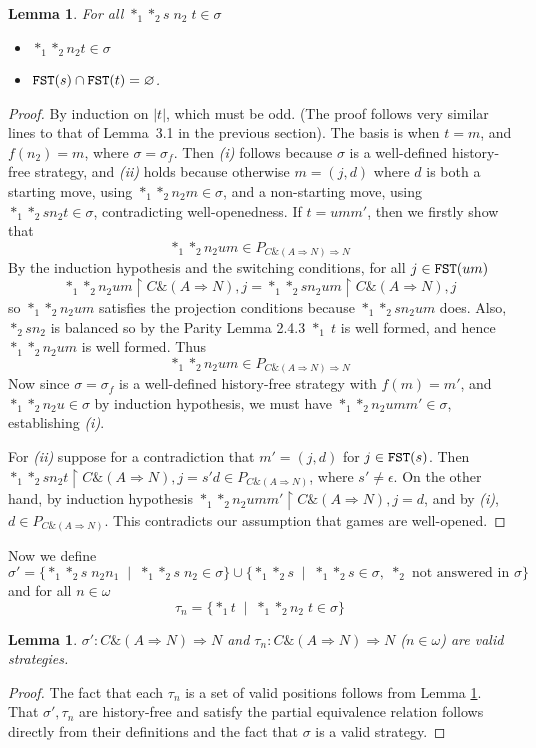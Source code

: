 \documentclass[11pt]{article}
\newtheorem{lemma}[theorem]{Lemma}
\newcommand{\Rest}{{\upharpoonright}}
\newcommand{\with}{\mbox{$\&$}}
\newcommand{\varempty}{\varnothing}
\begin{document}
\begin{lemma}\label{lem1}
For all $ *_1 *_2 s \;n_2 \; t\in\sigma$
\begin{itemize}
\item[(i)] $*_1 *_2 n_2 t\in\sigma$
\item[(ii)] ${\tt FST}(s)\cap {\tt FST}(t)=\varempty$.
\end{itemize}
\end{lemma}
\begin{proof} By induction on $|t|$, which must be odd. (The proof follows very similar
lines to that of Lemma~3.1 in the previous section). The basis is
when $t = m$, and $f(n_2 ) = m$, where $\sigma = \sigma_f$. Then
\textit{(i)} follows because $\sigma$ is a well-defined history-free
strategy,
and \textit{(ii)} holds because otherwise $m = (j, d)$ where $d$ is
both
a starting move, using $*_1 *_2 n_2 m \in \sigma$, and a non-starting
move, using $*_1 *_2 s n_2  t\in\sigma$, contradicting
well-openedness.
If $t=umm'$, then we firstly show that $$*_1 *_2  n_2 um
\in P_{C\with (A\Rightarrow N)\Rightarrow N}$$ By the induction
hypothesis and the switching conditions, for all $j\in {\tt
FST}(um)$ $$ *_1 *_2 n_2 um\Rest {C\with(A\Rightarrow N)}{,j} =
*_1 *_2 s n_2 um\Rest {C\with(A\Rightarrow N)}{,j}$$ so
$*_1*_2n_2um$ satisfies the projection conditions because $*_1*_2
sn_2 um$ does. Also, $*_2 s n_2$ is balanced so by the Parity
Lemma 2.4.3 $*_1\;t$ is well formed, and hence $*_1 *_2 n_2 um$ is
well formed. Thus $$*_1 *_2  n_2 um \in P_{C\with (A\Rightarrow
N)\Rightarrow N}$$ Now since $\sigma=\sigma_f$ is a well-defined
history-free strategy with $f(m)=m'$, and $*_1*_2 n_2 u\in\sigma$
by induction hypothesis, we must have $*_1*_2 n_2 umm'\in\sigma$,
establishing {\it (i)}.

For {\it (ii)} suppose for a contradiction that $m'=(j,d)$ for $j\in
{\tt FST}(s)$. Then $*_1*_2 s n_2 t\Rest {C\with (A\Rightarrow
  N)}{,j}=s'd\in P_{C\with(A\Rightarrow N)}$, where
$s'\neq\epsilon$. On the other hand, by induction hypothesis
$*_1*_2 n_2 umm'\Rest {C\with(A\Rightarrow N)}{,j}=d$, and by {\it
(i)}, $d\in P_{C\with(A\Rightarrow N)}$. This contradicts our
assumption that games are well-opened.
\end{proof}


Now we define
$$\sigma'=\{ *_1*_2 s\;  n_2 n_1\;\mid \; *_1 *_2 s \; n_2\in \sigma \}
\cup \{ *_1 *_2 s \;\mid \;*_1*_2s\in\sigma,\; *_2\mbox{ not answered in
  }\sigma\}$$
and for all $n\in\omega$
$$\tau_n=\{ *_1 t \;\mid \; *_1*_2 n_2 \; t \in \sigma\}$$
\begin{lemma}\label{lem2}
$\sigma':C\with(A\Rightarrow N)\Rightarrow N$ and
$\tau_n:C\with(A\Rightarrow N)\Rightarrow N$ ($n\in\omega$) are valid
strategies.
\end{lemma}
\begin{proof} The fact that each $\tau_n$ is a set of valid
positions follows from Lemma \ref{lem1}. That $\sigma',\tau_n$ are
history-free and satisfy the partial equivalence relation follows
directly from their definitions and the fact that $\sigma$ is a
valid strategy.
\end{proof}
\end{document}
